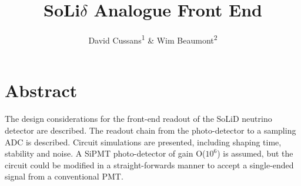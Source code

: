 \documentclass[
12pt, %
a4paper, %
oneside, %
headinclude,footinclude, %
apacite
]{scrartcl}
\title{SoLi$\delta$ Analogue Front End} %
\author{David Cussans\textsuperscript{1} \& Wim Beaumont\textsuperscript{2}} %
\date{} %
\begin{document}


\pagestyle{scrheadings} %


\maketitle %

\setcounter{tocdepth}{2} %

\tableofcontents %

\listoffigures %

\listoftables %

\section*{Abstract} %

The design considerations for the front-end readout of the SoLiD neutrino detector are described. The readout chain from the photo-detector to a sampling ADC is described. Circuit simulations are presented, including shaping time, stability and noise.  A SiPMT photo-detector of gain O($10^6$) is assumed, but the circuit could be modified in a straight-forwards manner to accept a single-ended signal from a conventional PMT.
\end{document}
